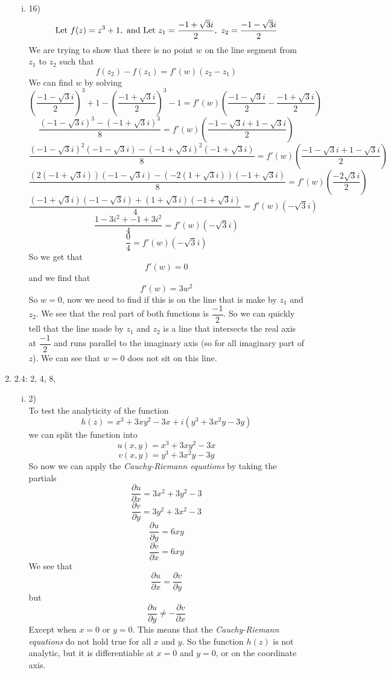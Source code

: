 \documentclass[11pt]{article}
\newcommand{\Let}{\textnormal{Let }}
\begin{document}
\begin{enumerate}
\begin{enumerate}[(i)]
\item 16)\\
$$\Let f(z) = z^3 +1,\ \textnormal{and } \Let z_1 = \frac{-1+\sqrt{3}i}{2},\ z_2 = \frac{-1-\sqrt{3}i}{2}$$
We are trying to show that there is no point $w$ on the line segment from $z_1$ to $z_2$ such that
$$f(z_2)-f(z_1) = f'(w)(z_2-z_1)$$
We can find $w$ by solving
$$\left(\frac{-1-\sqrt{3}i}{2}\right)^3 +1 - \left(\frac{-1+\sqrt{3}i}{2}\right)^3 - 1 = f'(w)\left(\frac{-1-\sqrt{3}i}{2}-\frac{-1+\sqrt{3}i}{2}\right)$$
$$\frac{(-1-\sqrt{3}i)^3  - (-1+\sqrt{3}i)^3}{8} = f'(w)\left(\frac{-1-\sqrt{3}i+1-\sqrt{3}i}{2}\right)$$
$$\frac{(-1-\sqrt{3}i)^2(-1-\sqrt{3}i)  - (-1+\sqrt{3}i)^2(-1+\sqrt{3}i)}{8} = f'(w)\left(\frac{-1-\sqrt{3}i+1-\sqrt{3}i}{2}\right)$$
$$ \frac{(2(-1+\sqrt{3}i))(-1-\sqrt{3}i)  - (-2(1+\sqrt{3}i))(-1+\sqrt{3}i)}{8}= f'(w)\left(\frac{-2\sqrt{3}i}{2}\right)$$
$$\frac{(-1+\sqrt{3}i)(-1-\sqrt{3}i)  +(1+\sqrt{3}i)(-1+\sqrt{3}i)}{4}= f'(w)\left(-\sqrt{3}i\right)$$
$$\frac{1-3i^2  +-1+3i^2}{4}= f'(w)\left(-\sqrt{3}i\right)$$
$$\frac{0}{4}= f'(w)\left(-\sqrt{3}i\right)$$
So we get that
$$f'(w)=0$$
and we find that $$f'(w) = 3w^2$$
So $w=0$, now we need to find if this is on the line that is make by $z_1$ and $z_2$. We see that the real part of both functions is $\dfrac{-1}{2}$.
So we can quickly tell that the line made by $z_1$ and $z_2$ is a line that intersects the real axis at $\dfrac{-1}{2}$ and runs parallel to the imaginary axis (so for all imaginary part of $z$). We can see that $w=0$ does not sit on this line.
\end{enumerate}

\item 2.4: 2, 4, 8, 
\begin{enumerate}[(i)]
\item 2)\\
To test the analyticity of the function 
$$h(z) = x^3 +3xy^2-3x+i(y^3+3x^2y-3y)$$
we can split the function into
$$u(x,y) = x^3 +3xy^2-3x$$
$$v(x,y) =y^3+3x^2y-3y$$
So now we can apply the \emph{Cauchy-Riemann equations} by taking the partials
$$\frac{\partial u}{\partial x}=3x^2+3y^2-3$$
$$\frac{\partial v}{\partial y}=3y^2+3x^2-3$$
$$\frac{\partial u}{\partial y}=6xy$$
$$\frac{\partial v}{\partial x}=6xy$$
We see that
$$\frac{\partial u}{\partial x}=\frac{\partial v}{\partial y}$$
but 
$$\frac{\partial u}{\partial y}\ne-\frac{\partial v}{\partial x}$$
Except when $x=0$ or $y=0$. This means that the \emph{Cauchy-Riemann equations} do not hold true for all $x$ and $y$. So the function $h(z)$ is not analytic, but it is differentiable at $x=0$ and $y=0$, or on the coordinate axis.


\end{enumerate}
\end{enumerate}
\end{document}
